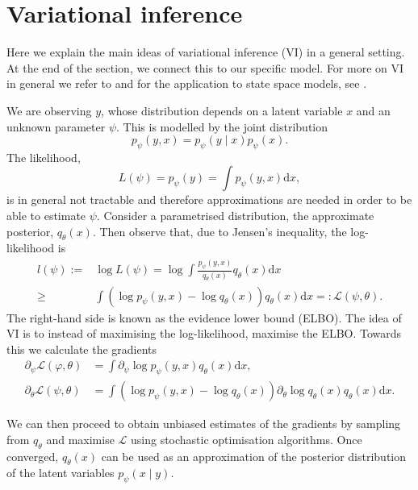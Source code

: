 \documentclass[preprint,12pt]{elsarticle}
\newcommand{\pa}[1]{\left(#1\right)}
\def\dd{\ensuremath{\mathrm{d}}}
\begin{document}
\section{Variational inference}\label{sec:vi}
Here we explain the main ideas of variational inference (VI) in a general setting. At the end of the section, we connect this to our specific model. For more on VI in general we refer to \cite{ranganath2014black} and for the application to state space models, see \cite{archer2015black}.
 
We are observing $y$, whose distribution depends on a latent variable $x$ and an unknown parameter $\psi$. This is modelled by the joint distribution
\begin{equation}
	p_\psi(y,x) = p_\psi(y\mid x)p_\psi(x).
\end{equation}
The likelihood,
\begin{equation}
	L(\psi)=p_\psi(y) = \int p_\psi(y,x)\dd x,
\end{equation}
is in general not tractable and therefore approximations are needed in order to be able to estimate $\psi$.
Consider a parametrised distribution, the approximate posterior, $q_\theta(x)$. Then observe that, due to Jensen's inequality, the log-likelihood is
\begin{align*}
	l(\psi):=&\log L(\psi) = \log \int \frac{p_\psi(y,x)}{q_\theta(x)} q_\theta(x)\dd x  \\
    \geq &\int \pa{\log p_\psi(y,x) - \log q_\theta(x)}q_\theta(x)\dd x=:\mathcal L(\psi,\theta).
\end{align*}
The right-hand side is known as the evidence lower bound (ELBO). The idea of VI is to instead of maximising the log-likelihood, maximise the ELBO. Towards this we calculate the gradients
\begin{align}
	\partial_\psi \mathcal L(\varphi,\theta) &= \int \partial_\psi \log p_\psi(y,x)q_\theta(x) \dd x ,\\
	\partial_\theta \mathcal L(\psi,\theta) &=  \int (\log p_\psi(y,x) - \log q_\theta(x))\partial_\theta \log q_\theta(x)  q_\theta(x)   \dd x.
\end{align}

We can then proceed to obtain unbiased estimates of the gradients by sampling from $q_\theta$ and maximise $\mathcal L$ using stochastic optimisation algorithms. Once converged,  $q_\theta(x)$ can be used as an approximation of the posterior distribution of the latent variables $p_\psi(x\mid y)$.
\end{document}
